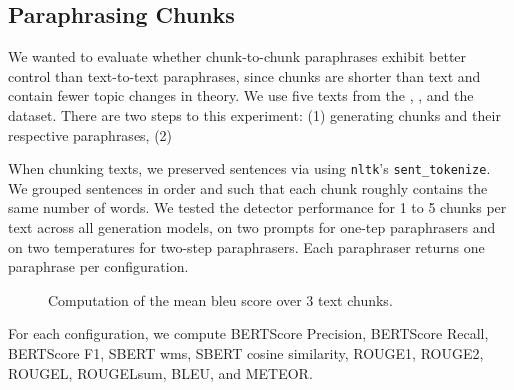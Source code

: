 \subsection{Paraphrasing Chunks}
\label{subsec:paraphrasing_chunks}

We wanted to evaluate whether chunk-to-chunk paraphrases exhibit better control than text-to-text paraphrases, since chunks are shorter than text and contain fewer topic changes in theory.
We use five texts from the \dataBlog{}, \dataGutenberg{}, and the \dataStudent{} dataset.
There are two steps to this experiment: (1) generating chunks and their respective paraphrases, (2) 

When chunking texts, we preserved sentences via using \texttt{nltk}'s \texttt{sent\_tokenize}.
We grouped sentences in order and such that each chunk roughly contains the same number of words.
We tested the detector performance for 1 to 5 chunks per text across all \imp{} generation models, on two prompts for one-tep paraphrasers and on two temperatures for two-step paraphrasers.
Each paraphraser returns one paraphrase per configuration.

\begin{figure}[ht]
  \centering
{}
  \caption{Computation of the mean \ac{bleu} score over 3 text chunks.}
  \label{fig:mean-bleu}
\end{figure}

For each configuration, we compute BERTScore Precision, BERTScore Recall, BERTScore F1, SBERT \ac{wms}, SBERT cosine similarity, ROUGE1, ROUGE2, ROUGEL, ROUGELsum, BLEU, and METEOR.
